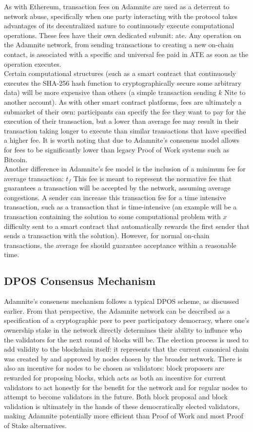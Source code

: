 \documentclass[conference]{IEEEtran}
\begin{document}
As with Ethereum, transaction fees on Adamnite are used as a deterrent to network abuse, specifically when one party interacting with the protocol takes advantages of its decentralized nature to continuously execute computational operations. These fees have their own dedicated subunit: ate. Any operation on the Adamnite network, from sending transactions to creating a new on-chain contact, is associated with a specific and universal fee paid in ATE as soon as the operation executes.\\
Certain computational structures (such as a smart contract that continuously executes the SHA-256 hash function to cryptographically secure some arbitrary data) will be more expensive than others (a simple transaction sending $k$ Nite to another account). As with other smart contract platforms, fees are ultimately a submarket of their own: participants can specify the fee they want to pay for the execution of their transaction, but a lower than average fee may result in their transaction taking longer to execute than similar transactions that have specified a higher fee. It is worth noting that due to Adamnite's consensus model allows for fees to be significantly lower than legacy Proof of Work systems such as Bitcoin.\\
Another difference in Adamnite's fee model is the inclusion of a minimum fee for average transaction: $t_f$ This fee is meant to represent the normative fee that guarantees a transaction will be accepted by the network, assuming average congestions. A sender can increase this transaction fee for a time intensive transaction, such as a transaction  that is time-intensive (an example will be a transaction containing the solution to some computational problem with $x$ difficulty sent to a smart contract that automatically rewards the first sender that sends a transaction with the solution). However, for normal on-chain transactions, the average fee should guarantee acceptance within a reasonable time.

\subsection{DPOS Consensus Mechanism}


Adamnite's consensus mechanism follows a typical DPOS scheme, as discussed earlier. From that perspective, the Adamnite network can be described as a specification of a cryptographic peer to peer participatory democracy, where one's ownership stake in the network directly determines their ability to influnce who the validators for the next round of blocks will be. The election process is used to add validity to the blockchain itself: it represents that the current canonical chain was created by and approved by nodes chosen by the broader network. There is also an incentive for nodes to be chosen as validators: block proposers are rewarded for proposing blocks, which acts as both an incentive for current validators to act honestly for the benefit for the network and for regular nodes to attempt to become validators in the future. Both block proposal and block validation is ultimately in the hands of these democratically elected validators, making Adamnite potentially more efficient than Proof of Work and most Proof of Stake alternatives.
\end{document}
